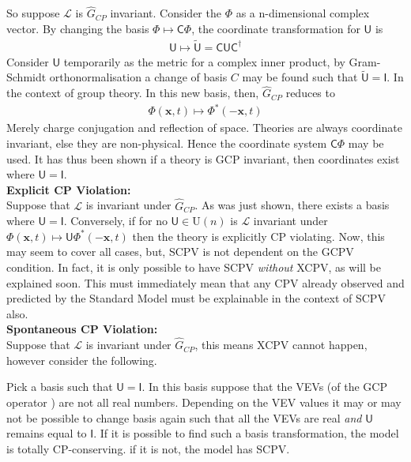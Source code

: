 \documentclass[floatfix,aps,prd,amsmath,amssymb]{revtex4}
\begin{document}
So suppose $\mathcal{L}$ is $\hat{G}_{CP}$ invariant. Consider the $\Phi$ as a n-dimensional complex vector. By changing the basis $\Phi \mapsto \mathsf{C}\Phi$, the coordinate transformation for $\mathsf{U}$ is 
\begin{align*}
\mathsf{U} \mapsto \tilde{\mathsf{U}}= \mathsf{CU}\mathsf{C}^\dagger
\end{align*}
Consider $\mathsf{U}$ temporarily as the metric for a complex inner product, by Gram-Schmidt orthonormalisation a change of basis $C$ may be found such that $\tilde{\mathsf{U}}=\mathsf{I}$. In the context of group theory. In this new basis, then, $\hat{G}_{CP}$ reduces to
\begin{align*}
\Phi(\mathbf{x},t) \mapsto \Phi^*(-\mathbf{x},t)
\end{align*}
Merely charge conjugation and reflection of space. Theories are always coordinate invariant, else they are non-physical. Hence the coordinate system $\mathsf{C}\Phi$ may be used. It has thus been shown if a theory is GCP invariant, then coordinates exist where $\mathsf{U}=\mathsf{I}$.\\

\textbf{Explicit CP Violation:}\\
Suppose that $\mathcal{L}$ is invariant under $\hat{G}_{CP}$. As was just shown, there exists a basis where $\mathsf{U}=\mathsf{I}$. Conversely, if for no $\mathsf{U}\in\mathrm{U}(n)$ is $\mathcal{L}$ invariant under $\Phi(\mathbf{x},t) \mapsto \mathsf{U}\Phi^*(-\mathbf{x},t)$ then the theory is explicitly CP violating. Now, this may seem to cover all cases, but, SCPV is not dependent on the GCPV condition. In fact, it is only possible to have SCPV \textit{without} XCPV, as will be explained soon. This must immediately mean that any CPV already observed and predicted by the Standard Model must be explainable in the context of SCPV also.\\

\textbf{Spontaneous CP Violation:}\\
Suppose that $\mathcal{L}$ is invariant under $\hat{G}_{CP}$, this means XCPV cannot happen, however consider the following.

Pick a basis such that $\mathsf{U}=\mathsf{I}$. In this basis suppose that the VEVs (of the GCP operator ) are not all real numbers. Depending on the VEV values it may or may not be possible to change basis again such that all the VEVs are real \textit{and} $\mathsf{U}$ remains equal to $\mathsf{I}$. If it is possible to find such a basis transformation, the model is totally CP-conserving. if it is not, the model has SCPV.
\end{document}
